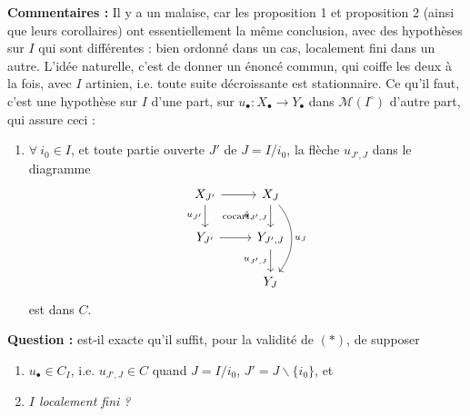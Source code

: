 \documentclass[11pt]{article}
\newcommand{\msp}[1]{\marginpar{\footnotesize [#1]}}
\newcommand{\cocart}{\text{\scriptsize cocart.}}
\begin{document}
\textbf{Commentaires :} Il y a un malaise, car les proposition 1 et proposition 2 (ainsi que leurs corollaires) ont essentiellement la même conclusion, avec des hypothèses sur $I$ qui sont \msp{page 23} différentes : bien ordonné dans un cas, localement fini dans un autre. L'idée naturelle, c'est de donner un énoncé commun, qui coiffe les deux à la fois, avec $I$ artinien, i.e. toute suite décroissante est stationnaire. Ce qu'il faut, c'est une hypothèse sur $I$ d'une part, sur $u_\bullet : X_\bullet \longrightarrow Y_\bullet$ dans $\mathcal{M}(I^\circ)$ d'autre part, qui assure ceci :

\begin{enumerate}
\item[$(*)$] $\forall\ i_0 \in I$, et toute partie ouverte $J'$ de $J = I/i_0$, la flèche $u_{J',J}$ dans le diagramme
\[
\begin{tikzcd}
X_{J'} \arrow[r] \arrow[d, "u_{J'}"'] \arrow[dr, phantom, "\cocart"] & X_J \arrow[d, "\tilde{u}_{J',J}"'] \arrow[dd, bend left=40, "u_J"] \\
Y_{J'} \arrow[r] & Y_{J',J} \arrow[d, "u_{J',J}"'] \\
 & Y_J
\end{tikzcd}
\]
est dans $C$.
\end{enumerate}

\textbf{Question :} est-il exacte qu'il suffit, pour la validité de $(*)$, de supposer %
\begin{enumerate}
\item[a)] $u_\bullet \in C_I$, i.e. $u_{J',J} \in C$ quand $J = I/i_0$, $J' = J \backslash \{i_0\}$, et
\item[b)] \textit{$I$ localement fini ?}
\end{enumerate}
\end{document}
